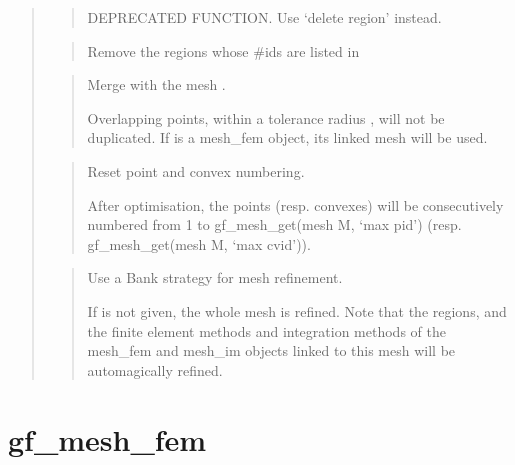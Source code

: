 \documentclass[a4paper,11pt,english]{sphinxmanual}
\begin{document}
\begin{quote}
\begin{quote}
DEPRECATED FUNCTION. Use ‘delete region’ instead.
\end{quote}

\begin{quote}

Remove the regions whose \#ids are listed in 
\end{quote}

\begin{quote}

Merge with the mesh .

Overlapping points, within a tolerance radius , will not be
duplicated. If  is a mesh\_fem object, its linked mesh will be used.
\end{quote}

\begin{quote}

Reset point and convex numbering.

After optimisation, the points (resp. convexes) will
be consecutively numbered from 1 to gf\_mesh\_get(mesh M, ‘max pid’)
(resp. gf\_mesh\_get(mesh M, ‘max cvid’)).
\end{quote}

\begin{quote}

Use a Bank strategy for mesh refinement.

If  is not given, the whole mesh is refined. Note
that the regions, and the finite element methods and
integration methods of the mesh\_fem and mesh\_im objects linked
to this mesh will be automagically refined.
\end{quote}
\end{quote}


\section{gf\_mesh\_fem}
\label{\detokenize{matlab_octave/cmdref_gf_mesh_fem:gf-mesh-fem}}\label{\detokenize{matlab_octave/cmdref_gf_mesh_fem::doc}}
\end{document}
